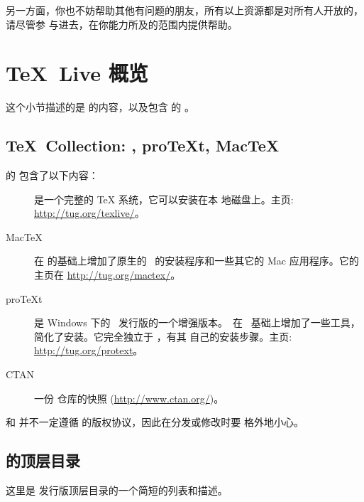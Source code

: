 \documentclass{article}
\begin{document}
另一方面，你也不妨帮助其他有问题的朋友，所有以上资源都是对所有人开放的，请尽管参
与进去，在你能力所及的范围内提供帮助。

\section{\protect\TeX\protect\ Live 概览}
\label{sec:overview-tl}

这个小节描述的是 \TL{} 的内容，以及包含 \TL{} 的 \TK{}。

\subsection{\protect\TeX\protect\ Collection: \protect\TL,
            pro\protect\TeX{}t, Mac\protect\TeX}
\label{sec:tl-coll-dists}

\TK{} 的 \DVD{} 包含了以下内容：

\begin{description}

\item [\TL] 是一个完整的 \TeX{} 系统，它可以安装在本
地磁盘上。主页: \url{http://tug.org/texlive/}。

\item [Mac\TeX] 在 \TL{} 的基础上增加了原生的 \MacOSX\ 的安装程序和一些其它的
Mac 应用程序。它的主页在 \url{http://tug.org/mactex/}。

\item [pro\TeX{}t] 是 Windows 下的 \MIKTEX\ 发行版的一个增强版本。\ProTeXt\ 在
\MIKTEX\ 基础上增加了一些工具，简化了安装。它完全独立于 \TL{}，有其
自己的安装步骤。主页: \url{http://tug.org/protext}。

\item [CTAN] 一份 \CTAN{} 仓库的快照 (\url{http://www.ctan.org/})。

\end{description}

\CTAN{} 和  并不一定遵循 \TL{} 的版权协议，因此在分发或修改时要
格外地小心。

\subsection{\protect\TL{} 的顶层目录}
\label{sec:tld}

这里是 \TL{} 发行版顶层目录的一个简短的列表和描述。
\end{document}
